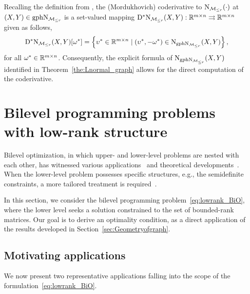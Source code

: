 \smallskip

Recalling the definition from \cite{mordukhovich2006variationalI}, the (Mordukhovich) coderivative to $\mathrm{N}_{\mathcal{M}_{\le r}}(\cdot)$ at $(X,Y)\in\mathrm{gph}\mathrm{N}_{\mathcal{M}_{\le r}}$ is a set-valued mapping $\mathrm{D}^* \mathrm{N}_{\mathcal{M}_{\le r}}(X,Y): \mathbb{R}^{m\times n}\rightrightarrows\mathbb{R}^{m\times n}$ given as follows, 
\begin{equation*}
    \mathrm{D}^* \mathrm{N}_{\mathcal{M}_{\le r}}(X,Y)[\omega^*] = \left\{ {\upsilon^*\in \mathbb{R}^{m\times n}\mid (\upsilon^*,-\omega^*)\in\mathrm{N}_{\mathrm{gph}\mathrm{N}_{\mathcal{M}_{\le r}}}(X,Y)} \right\},
\end{equation*}
for all $\omega^*\in\mathbb{R}^{m\times n}$. Consequently, the explicit formula of $\mathrm{N}_{\mathrm{gph}\mathrm{N}_{\mathcal{M}_{\le r}}}(X,Y)$ identified in Theorem~\ref{the:Lnormal_graph} allows for the direct computation of the coderivative. 

\section{Bilevel programming problems with low-rank structure}\label{sec:LRBP}
Bilevel optimization, in which upper- and lower-level problems are nested with each other, has witnessed various applications~\cite{yang2025sobiRL,yang2025lancbio} and theoretical developments~\cite{lin2014solving}. When the lower-level problem possesses specific structures, e.g., the semidefinite constraints, a more tailored treatment is required~\cite{ding2014SDCMPCC,wu2014SDCMPCC,dempe2018optimality}.

In this section, we consider the bilevel programming problem~\eqref{eq:lowrank_BiO}, where the lower level seeks a solution constrained to the set of bounded-rank matrices. Our goal is to derive an optimality condition, as a direct application of the results developed in Section~\ref{sec:Geometryofgraph}.

\subsection{Motivating applications}\label{sec:bilevel_app}
We now present two representative applications falling into the scope of the formulation~\eqref{eq:lowrank_BiO}.

